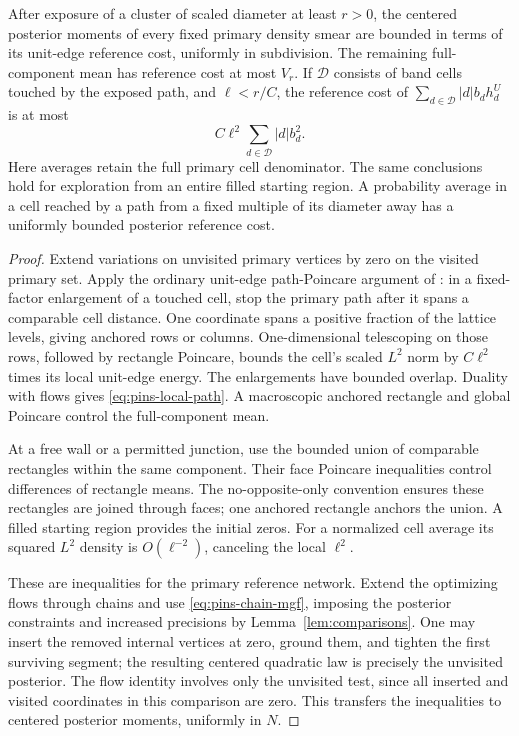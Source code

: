 \begin{lemma}\label{lem:pins-path}
After exposure of a cluster of scaled diameter at least \(r>0\),
the centered posterior moments of every fixed primary density
smear are bounded in terms of its unit-edge reference cost,
uniformly in subdivision. The remaining full-component mean has
reference cost at most \(V_r\).
If \(\mathcal D\) consists of band cells touched by the exposed
path, and \(\ell<r/C\), the reference cost of
\(\sum_{d\in\mathcal D}|d|b_dh_d^U\) is at most
\begin{equation}
                 C\ell^2\sum_{d\in\mathcal D}|d|b_d^2.
 \label{eq:pins-local-path}
\end{equation}
Here averages retain the full primary cell denominator.
The same conclusions hold for exploration from an entire filled
starting region. A probability average in a cell reached by a
path from a fixed multiple of its diameter away has a uniformly
bounded posterior reference cost.
\end{lemma}

\begin{proof}
Extend variations on unvisited primary vertices by zero on the
visited primary set. Apply the ordinary unit-edge
path-Poincare argument of : in a
fixed-factor enlargement of a touched cell, stop the primary
path after it spans a comparable cell distance. One coordinate
spans a positive fraction of the lattice levels, giving anchored
rows or columns. One-dimensional telescoping on those rows,
followed by rectangle Poincare, bounds the cell's scaled
\(L^2\) norm by \(C\ell^2\) times its local unit-edge energy.
The enlargements have bounded overlap. Duality with flows gives
\eqref{eq:pins-local-path}. A macroscopic anchored rectangle and
global Poincare control the full-component mean.

At a free wall or a permitted junction, use the bounded union
of comparable rectangles within the same component. Their face
Poincare inequalities control differences of rectangle means.
The no-opposite-only convention ensures these rectangles are
joined through faces; one anchored rectangle anchors the union.
A filled starting region provides the initial zeros.
For a normalized cell average its squared \(L^2\) density is
\(O(\ell^{-2})\), canceling the local \(\ell^2\).

These are inequalities for the primary reference network.
Extend the optimizing flows through chains and use
\eqref{eq:pins-chain-mgf}, imposing the posterior constraints
and increased precisions by Lemma~\ref{lem:comparisons}.
One may insert the removed internal vertices at zero, ground
them, and tighten the first surviving segment; the resulting
centered quadratic law is precisely the unvisited posterior.
The flow identity involves only the unvisited test, since all
inserted and visited coordinates in this comparison are zero.
This transfers the inequalities to centered posterior moments,
uniformly in \(N\).
\end{proof}

